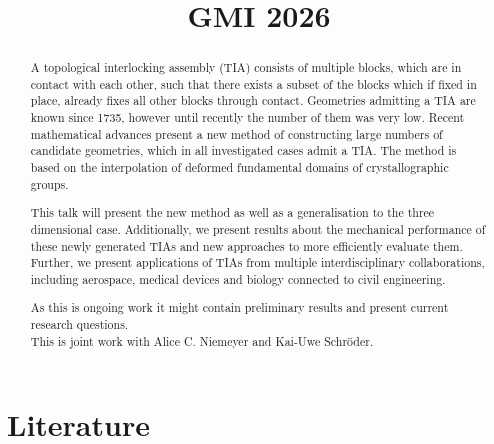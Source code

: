 \documentclass{article}
\title{GMI 2026}
\begin{document}
\begin{abstract}
	
	A topological interlocking assembly (TIA) consists of multiple blocks, which are in contact with each other, such that there exists a subset of the blocks which if fixed in place, already fixes all other blocks through contact. Geometries admitting a TIA are known since 1735, however until recently the number of them was very low. Recent mathematical advances present a new method of constructing large numbers of candidate geometries, which in all investigated cases admit a TIA. The method is based on the interpolation of deformed fundamental domains of crystallographic groups.
	
	This talk will present the new method as well as a generalisation to the three dimensional case. Additionally, we present results about the mechanical performance of these newly generated TIAs and new approaches to more efficiently evaluate them. Further, we present applications of TIAs from multiple interdisciplinary collaborations, including aerospace, medical devices and biology connected to civil engineering. 
	
	As this is ongoing work it might contain preliminary results and present current research questions.\\
	This is joint work with Alice C. Niemeyer and Kai-Uwe Schr\"oder.
\end{abstract}

\newpage
\section*{Literature}
\printbibliography[heading=bibintoc,title={Bibliography}]
\end{document}
